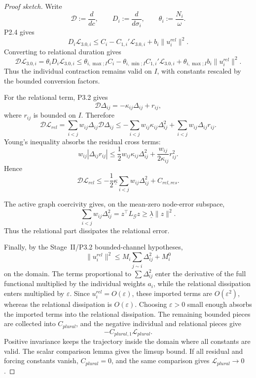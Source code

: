 \documentclass[11pt,a4paper]{article}
\def\mathfrak#1{#1}%
\def\mathrm#1{#1}%
\theoremstyle{definition}
\theoremstyle{plain}
\theoremstyle{remark}
\begin{document}
\begin{proof}[Proof sketch]
Write
\[
\mathscr D:=\frac{d}{d\mathfrak c},
\qquad
D_i:=\frac{d}{d\sigma_i},
\qquad
\theta_i:=\frac{N_i}{\omega}.
\]
P2.4 gives
\[
D_i\mathcal L_{3.0,i}
\le
C_i-C_{1,i}'\mathcal L_{3.0,i}
+
b_i\lVert u_i^{\mathrm{rel}}\rVert^2.
\]
Converting to relational duration gives
\[
\mathscr D\mathcal L_{3.0,i}
=
\theta_iD_i\mathcal L_{3.0,i}
\le
\theta_{i,\max;I}C_i
-
\theta_{i,\min;I}C_{1,i}'\mathcal L_{3.0,i}
+
\theta_{i,\max;I}b_i\lVert u_i^{\mathrm{rel}}\rVert^2.
\]
Thus the individual contraction remains valid on \(I\), with constants rescaled by
the bounded conversion factors.

For the relational term, P3.2 gives
\[
\mathscr D\Delta_{ij}
=
-\kappa_{ij}\Delta_{ij}
+
r_{ij},
\]
where \(r_{ij}\) is bounded on \(I\). Therefore
\[
\mathscr D\mathcal L_{\mathrm{rel}}
=
\sum_{i<j}w_{ij}\Delta_{ij}\mathscr D\Delta_{ij}
\le
-\sum_{i<j}w_{ij}\kappa_{ij}\Delta_{ij}^2
+
\sum_{i<j}w_{ij}\Delta_{ij}r_{ij}.
\]
Young's inequality absorbs the residual cross terms:
\[
w_{ij}|\Delta_{ij}r_{ij}|
\le
\frac12 w_{ij}\kappa_{ij}\Delta_{ij}^2
+
\frac{w_{ij}}{2\kappa_{ij}}r_{ij}^2.
\]
Hence
\[
\mathscr D\mathcal L_{\mathrm{rel}}
\le
-\frac12\underline\kappa
\sum_{i<j}w_{ij}\Delta_{ij}^2
+
C_{\mathrm{rel,res}}.
\]

The active graph coercivity gives, on the mean-zero node-error subspace,
\[
\sum_{i<j}w_{ij}\Delta_{ij}^2
=
z^\top L_{\mathcal G}z
\ge
\underline\lambda\lVert z\rVert^2.
\]
Thus the relational part dissipates the relational error.

Finally, by the Stage~II/P3.2 bounded-channel hypotheses,
\[
\lVert u_i^{\mathrm{rel}}\rVert^2
\le
M_i\sum_{j\sim i}\Delta_{ij}^2+M_i^0
\]
on the domain. The terms proportional to \(\sum\Delta_{ij}^2\) enter the derivative
of the full functional multiplied by the individual weights \(a_i\), while the
relational dissipation enters multiplied by \(\varepsilon\). Since
\(u_i^{\mathrm{rel}}=O(\varepsilon)\), these imported terms are \(O(\varepsilon^2)\),
whereas the relational dissipation is \(O(\varepsilon)\). Choosing \(\varepsilon>0\)
small enough absorbs the imported terms into the relational dissipation. The
remaining bounded pieces are collected into \(C_{\mathrm{plural}}\), and the
negative individual and relational pieces give
\[
-C_{\mathrm{plural},1}\mathcal L_{\mathrm{plural}}.
\]
Positive invariance keeps the trajectory inside the domain where all constants are
valid. The scalar comparison lemma gives the limsup bound. If all residual and
forcing constants vanish, \(C_{\mathrm{plural}}=0\), and the same comparison gives
\(\mathcal L_{\mathrm{plural}}\to0\). \qedhere
\end{proof}
\end{document}
